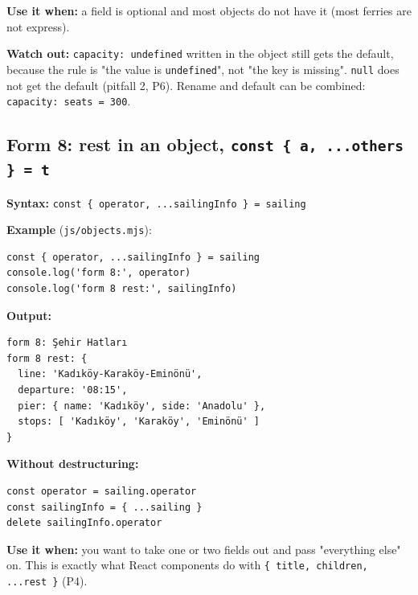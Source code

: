 \documentclass[
  10pt,
]{article}
\begin{document}
\textbf{Use it when:} a field is optional and most objects do not have
it (most ferries are not express).

\textbf{Watch out:} \texttt{capacity:\allowbreak{} undefined} written in
the object still gets the default, because the rule is "the value is
\texttt{undefined}", not "the key is missing". \texttt{null} does not
get the default (pitfall 2, P6). Rename and default can be combined:
\texttt{capacity:\allowbreak{} seats =\allowbreak{} 300}.

\hypertarget{form-8-rest-in-an-object-const--a-others---t}{%
\subsection{\texorpdfstring{Form 8: rest in an object,
\texttt{const \{ a,\allowbreak{} .\allowbreak{}.\allowbreak{}.\allowbreak{}others \} =\allowbreak{} t}}{Form 8: rest in an object, }}\label{form-8-rest-in-an-object-const--a-others---t}}

\textbf{Syntax:}
\texttt{const \{ operator,\allowbreak{} .\allowbreak{}.\allowbreak{}.\allowbreak{}sailingInfo \} =\allowbreak{} sailing}

\textbf{Example} (\texttt{js/\allowbreak{}objects.\allowbreak{}mjs}):

\begin{verbatim}
const { operator, ...sailingInfo } = sailing
console.log('form 8:', operator)
console.log('form 8 rest:', sailingInfo)
\end{verbatim}

\textbf{Output:}

\begin{verbatim}
form 8: Şehir Hatları
form 8 rest: {
  line: 'Kadıköy-Karaköy-Eminönü',
  departure: '08:15',
  pier: { name: 'Kadıköy', side: 'Anadolu' },
  stops: [ 'Kadıköy', 'Karaköy', 'Eminönü' ]
}
\end{verbatim}

\textbf{Without destructuring:}

\begin{verbatim}
const operator = sailing.operator
const sailingInfo = { ...sailing }
delete sailingInfo.operator
\end{verbatim}

\textbf{Use it when:} you want to take one or two fields out and pass
"everything else" on. This is exactly what React components do with
\texttt{\{ title,\allowbreak{} children,\allowbreak{} .\allowbreak{}.\allowbreak{}.\allowbreak{}rest \}}
(P4).
\end{document}
